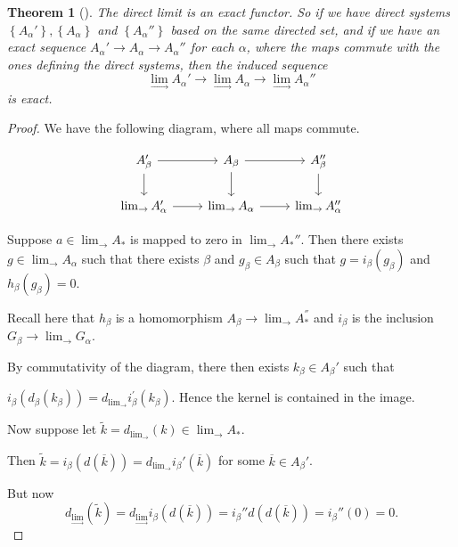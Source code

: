\documentclass[reqno]{amsart}
\newtheorem{theorem}{Theorem}[section]
\theoremstyle{definition}
\theoremstyle{remark}
\begin{document}
\begin{theorem}[]\label{Thm:Direct-Limit-Functor}
    The direct limit is an exact functor.
    So if we have direct systems
    $\left\{ A_{\alpha}' \right\} ,
    \left\{ A_{\alpha} \right\} $ and
    $\left\{ A_{\alpha}'' \right\} $ based on the same
    directed set, and if we have
    an exact sequence
    $A_{\alpha}' \to A_{\alpha} \to A_{\alpha}''$ for each
    $\alpha$, where the maps commute with the ones
    defining the direct systems, then the induced sequence
    \[
    \lim_{\rightarrow} A_{\alpha}' \to 
    \lim_{\rightarrow} A_{\alpha} \to 
    \lim_{\rightarrow} A_{\alpha}''
    \] 
    is exact.
\end{theorem}

\begin{proof}
    We have the following diagram, where all
    maps commute.

\[\begin{tikzcd}
	{A_{\beta}'} & {A_{\beta}} & {A_{\beta}''} \\
	{\lim_{\rightarrow}A_{\alpha}'} & {\lim_{\rightarrow}A_{\alpha}} & {\lim_{\rightarrow}A_{\alpha}''}
	\arrow[from=1-1, to=1-2]
	\arrow[from=1-1, to=2-1]
	\arrow[from=1-2, to=1-3]
	\arrow[from=1-2, to=2-2]
	\arrow[from=1-3, to=2-3]
	\arrow[from=2-1, to=2-2]
	\arrow[from=2-2, to=2-3]
\end{tikzcd}\]

Suppose
$a \in \lim_{\rightarrow} A_*$ is mapped to zero
in $\lim_{\rightarrow} A_*''$.
Then there exists 
$g \in \lim_{\rightarrow}A_{\alpha}$ such that
there exists $\beta$ and
$g_{\beta} \in A_{\beta}$ such that
$g = i_{\beta}(g_{\beta})$ and
$h_{\beta}(g_{\beta}) = 0$.

Recall here that
$h_{\beta}$ is a homomorphism
$A_{\beta} \to \lim_{\rightarrow}A_*^{''}$ and
$i_{\beta}$ is the inclusion
$G_{\beta} \to \lim_{\rightarrow}G_{\alpha}$.

By commutativity of the diagram, there
then exists $k_{\beta} \in 
A_{\beta}'$ such that

$i_{\beta} \left( d_{\beta} (k_{\beta}) \right) 
= d_{\lim_{\rightarrow}} i_{\beta}^{'} (k_{\beta})$.
Hence the kernel is contained in the image.

Now suppose let $\tilde{k} = 
d_{\lim_{\rightarrow}} (k) \in 
\lim_{\rightarrow}A_*$.

Then $\tilde{k} = 
i_{\beta}\left( d (\overline{k}) \right) 
= d_{\lim_{\rightarrow}}
i_{\beta}' \left( \overline{k} \right) $ for
some $\overline{k} \in A_{\beta}'$.


But now
\[
d_{\lim_{\rightarrow}} (\tilde{k})
= d_{\lim_{\rightarrow}}
i_{\beta} \left( d \left( \overline{k} \right)  \right) 
= i_{\beta}'' 
d\left( d \left( \overline{k} \right)  \right) 
= i_{\beta}'' (0) = 0.
\] 
\end{proof}
\end{document}
